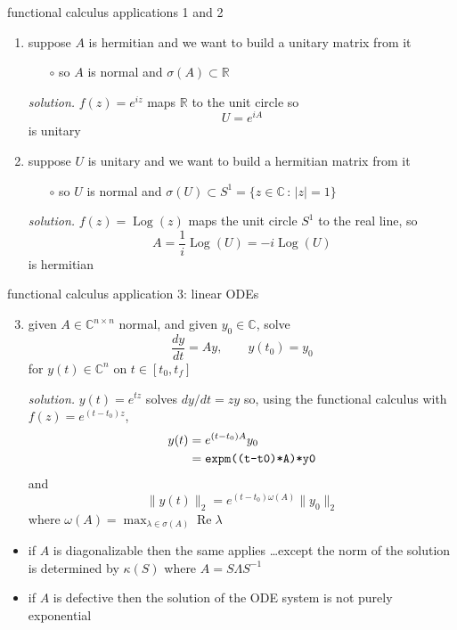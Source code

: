 \documentclass[10pt,hyperref]{beamer}
\newcommand{\CC}{\mathbb{C}}
\newcommand{\RR}{\mathbb{R}}
\begin{document}
\begin{frame}{functional calculus applications 1 and 2}

\begin{enumerate}
\item suppose $A$ is hermitian and we want to build a unitary matrix from it
    \begin{itemize}
    \item[$\circ$] so $A$ is normal and $\sigma(A) \subset \RR$
    \end{itemize}

\medskip
\emph{solution.} $f(z) = e^{iz}$ maps $\RR$ to the unit circle so
    $$U = e^{iA}$$
is unitary

\bigskip
\item suppose $U$ is unitary and we want to build a hermitian matrix from it
    \begin{itemize}
    \item[$\circ$] so $U$ is normal and $\sigma(U) \subset S^1 = \{z\in \CC\,:\, |z|=1\}$
    \end{itemize}
\newcommand{\Log}{\operatorname{Log}}

\medskip
\emph{solution.} $f(z) = \Log(z)$ maps the unit circle $S^1$ to the real line, so
    $$A = \frac{1}{i} \Log(U) = -i \Log(U)$$
is hermitian
\end{enumerate}
\end{frame}


\begin{frame}{functional calculus application 3: linear ODEs}

\begin{enumerate}
\setcounter{enumi}{2}
\item given $A \in \CC^{n\times n}$ normal, and given $y_0\in\CC$, solve
    $$\frac{dy}{dt} = A y, \qquad y(t_0) = y_0$$
for $y(t) \in \CC^n$ on $t\in [t_0,t_f]$ 

\medskip
\emph{solution.} $y(t) = e^{tz}$ solves $dy/dt=zy$ so, using the functional calculus with $f(z) = e^{(t-t_0)z}$,
\begin{align*}
    y(t) &= e^{(t-t_0)A} y_0 \\
         &= \text{\texttt{expm((t-t0)*A)*y0}}
\end{align*}
and
    $$\|y(t)\|_2=e^{(t-t_0)\omega(A)}\|y_0\|_2$$
where $\omega(A) = \max_{\lambda\in\sigma(A)} \operatorname{Re} \lambda$
\end{enumerate}

\bigskip
\begin{itemize}
\item if $A$ is diagonalizable then the same applies \dots except the norm of the solution is determined by $\kappa(S)$ where $A=S \Lambda S^{-1}$
\item if $A$ is defective then the solution of the ODE system is not purely exponential
\end{itemize}
\end{frame}
\end{document}
